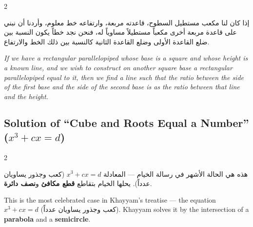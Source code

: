\documentclass[11pt,a4paper]{book}
\begin{document}
\begin{propositionbox}
\begin{paracol}{2}

\begin{Arabic}
إذا كان لنا مكعب مستطيل السطوح، قاعدته مربعة، وارتفاعه خط معلوم، وأردنا أن نبني على قاعدة مربعة أخرى مكعباً مستطيلاً مساوياً له، فنحن نجد خطاً يكون النسبة بين ضلع القاعدة الأولى وضلع القاعدة الثانية كالنسبة بين ذلك الخط والارتفاع.
\end{Arabic}

\switchcolumn

\textit{If we have a rectangular parallelopiped whose base is a square and whose height is a known line, and we wish to construct on another square base a rectangular parallelopiped equal to it, then we find a line such that the ratio between the side of the first base and the side of the second base is as the ratio between that line and the height.}

\end{paracol}
\end{propositionbox}

\subsection{Solution of ``Cube and Roots Equal a Number'' ($x^3 + cx = d$)}
\label{subsec:classic-case}

\begin{paracol}{2}

\begin{Arabic}
هذه هي الحالة الأشهر في رسالة الخيام --- المعادلة $x^3 + c x = d$ (كعب وجذور يساويان عدداً). يحلها الخيام بتقاطع \textbf{قطع مكافئ} و\textbf{نصف دائرة}.
\end{Arabic}

\switchcolumn

This is the most celebrated case in Khayyam's treatise --- the equation $x^3 + cx = d$ (\textarabic{كعب وجذور يساويان عدداً}). Khayyam solves it by the intersection of a \textbf{parabola} and a \textbf{semicircle}.

\end{paracol}
\end{document}
